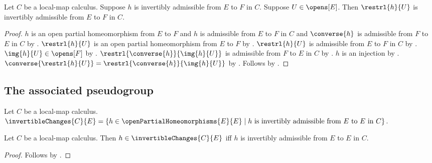 \begin{theorem}\label{invertibly_admissible_restriction}
    Let $C$ be a local-map calculus.
    Suppose $h$ is invertibly admissible from $E$ to $F$ in $C$.
    Suppose $U\in\opens[E]$.
    Then $\restrl{h}{U}$ is invertibly admissible from $E$ to $F$ in $C$.
\end{theorem}
\begin{proof}
    $h$ is an open partial homeomorphism from $E$ to $F$ and
        $h$ is admissible from $E$ to $F$ in $C$ and
        $\converse{h}$ is admissible from $F$ to $E$ in $C$ by
        .
    $\restrl{h}{U}$ is an open partial homeomorphism from $E$ to $F$ by
        .
    $\restrl{h}{U}$ is admissible from $E$ to $F$ in $C$ by
        .
    $\img{h}{U}\in\opens[F]$ by .
    $\restrl{\converse{h}}{\img{h}{U}}$ is admissible from $F$ to $E$ in $C$ by
        .
    $h$ is an injection by .
    $\converse{\restrl{h}{U}}=\restrl{\converse{h}}{\img{h}{U}}$ by
        .
    Follows by .
\end{proof}

\subsection{The associated pseudogroup}

\begin{definition}\label{invertible_changes}
    Let $C$ be a local-map calculus.
    $\invertibleChanges{C}{E}=
        \{h\in\openPartialHomeomorphisms{E}{E}\mid
            \text{$h$ is invertibly admissible from $E$ to $E$ in $C$}\}$.
\end{definition}

\begin{theorem}\label{invertible_changes_iff}
    Let $C$ be a local-map calculus.
    Then $h\in\invertibleChanges{C}{E}$ iff
        $h$ is invertibly admissible from $E$ to $E$ in $C$.
\end{theorem}
\begin{proof}
    Follows by .
\end{proof}


